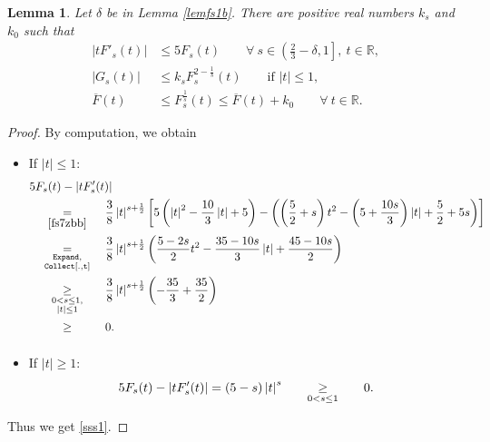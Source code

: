 \documentclass[11pt, a4paper]{article}
\newtheorem{lemma}[theorem]{Lemma}
\numberwithin{equation}{section}
\newcommand{\coex}[2][\hphantom{longexplanation}]{%
  \underset{{#1}}{\overset{\hphantom{longexplanation}}{#2}}
}
\newcommand{\RR}{{\mathbb R}}
\newcommand{\abs}[1]{\left\lvert #1\right\rvert}
\begin{document}
\begin{lemma} Let  $\delta$ be in Lemma \ref{lemfs1b}.  There are positive real numbers  $k_{s}$  and $k_{0}$ such that
\begin{align}
  \abs{tF'_{s}(t)}
  &\le 5F_{s}(t)\qquad\forall~s\in\left(\frac{2}{3}-\delta,1 \right],~t\in\RR,
\label{sss1}\\
\abs{G_s(t)}
&\le k_{s}F_s^{2-\frac{1}{s}}(t)\qquad \text{if } \abs{t}\le 1,
 \label{sss3}\\
 \overline{F}(t)
 &\le F_{s}^{\frac{1}{s}}(t)\le \overline{F}(t)+k_{0}\qquad \forall~t\in \RR.
 \label{sss4}
\end{align}
\label{lemfs1c}
\end{lemma}
\begin{proof}
  By computation, we obtain 
  \begin{itemize}[wide]
  \item If $\abs{t} \le 1$:
  \begin{align*}
    &5F_{s}(t)-\abs{tF_{s}'(t)}\\
    &\coex[\eqref{fs7zbb}]{=}
      \frac{3}{8} \abs{t}^{s+\frac{1}{2}}
      \left[5\left(\abs{t}^{2}-\frac{10}{3}\abs{t} +5
      \right)-\left(\left(\frac{5}{2} + s \right) t^2 - \left(5 +
      \frac{10s}{3} \right)\abs{t} + \frac{5}{2} + 5s  \right)
      \right]\\
    &\coex[\substack{\mathtt{Expand},\\\mathtt{Collect[.,t]}}]{=}
    \frac{3}{8} \abs{t}^{s+\frac{1}{2}} \left(\frac{5-2s}{2}
    t^{2}-\frac{35-10s}{3}\abs{t}+\frac{45-10s}{2} \right)\\
    &\coex[\substack{0<s\le 1,\\  \abs{t}\le 1}]{\ge}
    \frac{3}{8} \abs{t}^{s+\frac{1}{2}}\left(
    -\frac{35}{3}+\frac{35}{2} \right) \\
    &\coex{\ge} 0.
  \end{align*} 
\item If $\abs{t} \ge 1$: 
\begin{align*}
5F_{s}(t)-\abs{tF_{s}'(t)}=(5-s)\abs{t}^{s}\coex[0<s\le 1]{\ge} 0.
\end{align*}
\end{itemize}
Thus we get \eqref{sss1}.


\end{proof}
\end{document}
